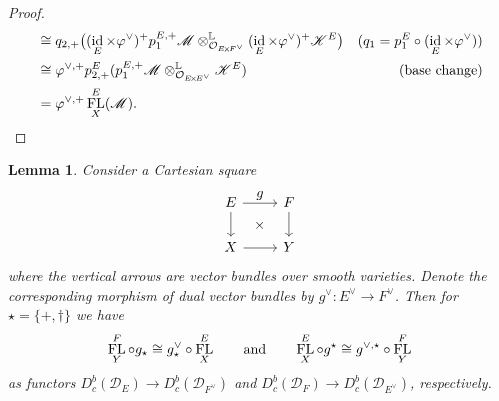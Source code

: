 \documentclass[11pt]{article}
\let\ts\textstyle
\newtheorem{lem}[thm]{Lemma}
\DeclareMathOperator{\FL}{\textup{FL}}
\DeclareMathOperator{\id}{\textup{id}}
\begin{document}
\begin{proof}
\begin{align*}
&\cong q_{2,+} \big((\id_E \times \varphi^\vee)^+ p_1^{E,+} \mathscr M \otimes^{\mathbb L}_{\O_{E\!\times\!F^\vee}} (\id_E \times \varphi^\vee)^+ \mathscr K^E\big) & \text{\small ($q_1 = p_1^E \circ (\id_E \times \varphi^\vee)$)}\\
&\cong \varphi^{\vee,+} p^E_{2,+} (p_1^{E,+} \mathscr M \otimes^{\mathbb L}_{\O_{E\!\times\!E^\vee}} \mathscr K^E) & \text{\small (base change)}\\
&= \varphi^{\vee,+} \FL_X^E(\mathscr M). & \qedhere
\end{align*}
\end{proof}

\begin{lem} \label{lem:FLCartesian}
Consider a Cartesian square\vspace*{-5pt}\enlargethispage{1.5\baselineskip}
\[
\begin{tikzcd}
E \ar{r}{\ts \ts g} \ar{d} \ar[phantom]{dr}{\times} & F \ar{d} \\
X \ar{r} & Y
\end{tikzcd}
\]
where the vertical arrows are vector bundles over smooth varieties. Denote the corresponding morphism of dual vector bundles by $g^\vee \colon E^\vee \to F^\vee$. Then for
$\star=\{+,\dag\}$ we have\vspace*{-5pt}
\[
\FL_Y^F \circ g_\star \cong g^\vee_\star \circ \FL_X^E \qquad \text{and} \qquad
\FL_X^E \circ g^\star \cong g^{\vee,\star} \circ \FL_Y^F
\]
as functors $D_{c}^b(\mathscr D_E) \to D_{c}^b(\mathscr D_{F^\vee})$ and $D_{c}^b(\mathscr D_F) \to D_{c}^b(\mathscr D_{E^\vee})$, respectively.
\end{lem}
\end{document}
